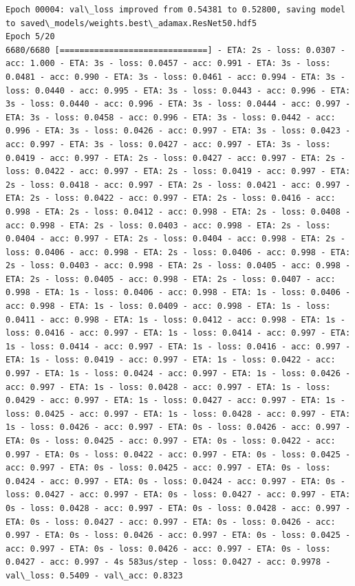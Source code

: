 \documentclass[11pt]{article}
\begin{document}
\begin{Verbatim}[commandchars=\\\{\}]
Epoch 00004: val\_loss improved from 0.54381 to 0.52800, saving model to saved\_models/weights.best\_adamax.ResNet50.hdf5
Epoch 5/20
6680/6680 [==============================] - ETA: 2s - loss: 0.0307 - acc: 1.000 - ETA: 3s - loss: 0.0457 - acc: 0.991 - ETA: 3s - loss: 0.0481 - acc: 0.990 - ETA: 3s - loss: 0.0461 - acc: 0.994 - ETA: 3s - loss: 0.0440 - acc: 0.995 - ETA: 3s - loss: 0.0443 - acc: 0.996 - ETA: 3s - loss: 0.0440 - acc: 0.996 - ETA: 3s - loss: 0.0444 - acc: 0.997 - ETA: 3s - loss: 0.0458 - acc: 0.996 - ETA: 3s - loss: 0.0442 - acc: 0.996 - ETA: 3s - loss: 0.0426 - acc: 0.997 - ETA: 3s - loss: 0.0423 - acc: 0.997 - ETA: 3s - loss: 0.0427 - acc: 0.997 - ETA: 3s - loss: 0.0419 - acc: 0.997 - ETA: 2s - loss: 0.0427 - acc: 0.997 - ETA: 2s - loss: 0.0422 - acc: 0.997 - ETA: 2s - loss: 0.0419 - acc: 0.997 - ETA: 2s - loss: 0.0418 - acc: 0.997 - ETA: 2s - loss: 0.0421 - acc: 0.997 - ETA: 2s - loss: 0.0422 - acc: 0.997 - ETA: 2s - loss: 0.0416 - acc: 0.998 - ETA: 2s - loss: 0.0412 - acc: 0.998 - ETA: 2s - loss: 0.0408 - acc: 0.998 - ETA: 2s - loss: 0.0403 - acc: 0.998 - ETA: 2s - loss: 0.0404 - acc: 0.997 - ETA: 2s - loss: 0.0404 - acc: 0.998 - ETA: 2s - loss: 0.0406 - acc: 0.998 - ETA: 2s - loss: 0.0406 - acc: 0.998 - ETA: 2s - loss: 0.0403 - acc: 0.998 - ETA: 2s - loss: 0.0405 - acc: 0.998 - ETA: 2s - loss: 0.0405 - acc: 0.998 - ETA: 2s - loss: 0.0407 - acc: 0.998 - ETA: 1s - loss: 0.0406 - acc: 0.998 - ETA: 1s - loss: 0.0406 - acc: 0.998 - ETA: 1s - loss: 0.0409 - acc: 0.998 - ETA: 1s - loss: 0.0411 - acc: 0.998 - ETA: 1s - loss: 0.0412 - acc: 0.998 - ETA: 1s - loss: 0.0416 - acc: 0.997 - ETA: 1s - loss: 0.0414 - acc: 0.997 - ETA: 1s - loss: 0.0414 - acc: 0.997 - ETA: 1s - loss: 0.0416 - acc: 0.997 - ETA: 1s - loss: 0.0419 - acc: 0.997 - ETA: 1s - loss: 0.0422 - acc: 0.997 - ETA: 1s - loss: 0.0424 - acc: 0.997 - ETA: 1s - loss: 0.0426 - acc: 0.997 - ETA: 1s - loss: 0.0428 - acc: 0.997 - ETA: 1s - loss: 0.0429 - acc: 0.997 - ETA: 1s - loss: 0.0427 - acc: 0.997 - ETA: 1s - loss: 0.0425 - acc: 0.997 - ETA: 1s - loss: 0.0428 - acc: 0.997 - ETA: 1s - loss: 0.0426 - acc: 0.997 - ETA: 0s - loss: 0.0426 - acc: 0.997 - ETA: 0s - loss: 0.0425 - acc: 0.997 - ETA: 0s - loss: 0.0422 - acc: 0.997 - ETA: 0s - loss: 0.0422 - acc: 0.997 - ETA: 0s - loss: 0.0425 - acc: 0.997 - ETA: 0s - loss: 0.0425 - acc: 0.997 - ETA: 0s - loss: 0.0424 - acc: 0.997 - ETA: 0s - loss: 0.0424 - acc: 0.997 - ETA: 0s - loss: 0.0427 - acc: 0.997 - ETA: 0s - loss: 0.0427 - acc: 0.997 - ETA: 0s - loss: 0.0428 - acc: 0.997 - ETA: 0s - loss: 0.0428 - acc: 0.997 - ETA: 0s - loss: 0.0427 - acc: 0.997 - ETA: 0s - loss: 0.0426 - acc: 0.997 - ETA: 0s - loss: 0.0426 - acc: 0.997 - ETA: 0s - loss: 0.0425 - acc: 0.997 - ETA: 0s - loss: 0.0426 - acc: 0.997 - ETA: 0s - loss: 0.0427 - acc: 0.997 - 4s 583us/step - loss: 0.0427 - acc: 0.9978 - val\_loss: 0.5409 - val\_acc: 0.8323


\end{Verbatim}
\end{document}
